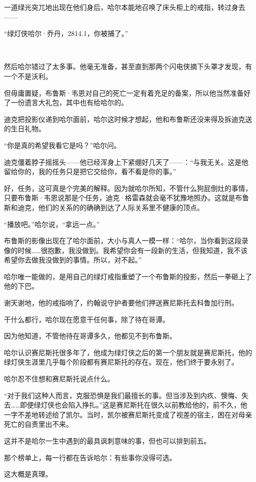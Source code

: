 \documentclass[../main]{subfiles}
\begin{document}
一道绿光突兀地出现在他们身后，哈尔本能地召唤了床头柜上的戒指，转过身去——

“绿灯侠哈尔·乔丹，2814.1，你被捕了。”

~\

然后哈尔错过了太多事。他毫无准备，甚至直到那两个闪电侠摘下头罩才发现，有一个不是沃利。

但毋庸置疑，布鲁斯·韦恩对自己的死亡一定有着充足的备案，所以他当然准备好了一份遗言大礼包，其中也有给哈尔的。

迪克把投影仪递到哈尔面前，哈尔这时候才想起，他和布鲁斯还没来得及拆迪克送的生日礼物。

“你是真的希望我看它是吗？”哈尔问。

迪克僵着脖子摇摇头——他已经浑身上下紧绷好几天了——：“与我无关。这是他留给你的，我的任务只是把它交给你，看不看是你的事。”

好，任务，这可真是个完美的解释。因为就哈尔所知，不管什么狗屁倒灶的事情，只要布鲁斯·韦恩说那是个任务，迪克·格雷森就会毫不犹豫地照办。这就是布鲁斯和迪克，他们的关系的的确确到达了人际关系里不健康的顶点。

“播放吧。”哈尔说，“拿远一点。”

布鲁斯的影像出现在了哈尔面前，大小与真人一模一样：“哈尔，当你看到这段录像的时候……很抱歉，我没做到。我希望你会有一段新的生活，但我知道，我不该希望你去做我没做到的事情。所以，对不起。”

哈尔唯一能做的，是用自己的绿灯戒指重塑了一个布鲁斯的投影，然后一拳砸上了他的下巴。

谢天谢地，他的戒指响了，约翰说守护者要他们押送赛尼斯托去科鲁加行刑。

干什么都行，哈尔现在愿意干任何事，除了待在哥谭。

因为他知道，不管他待在哥谭多久，他都见不到布鲁斯。

哈尔认识赛尼斯托很多年了，他成为绿灯侠之后的第一个朋友就是赛尼斯托，他的绿灯侠生涯里几乎每个阶段都有赛尼斯托的存在。现在，他们终于要永别了。

哈尔忍不住想和赛尼斯托说点什么。

“对于我们这种人而言，克服恐惧是我们最擅长的事。但当涉及到内疚、懊悔、失去……即便绿灯侠也会陷入挣扎。”这是赛尼斯托在很久以前教给他的，前不久，他一字不差地转述给了凯尔。当时，凯尔被赛尼斯托变成了视差的宿主，困在对母亲死亡的自责里出不来。

这并不是哈尔一生中遇到的最具讽刺意味的事，但也可以排到前五。

那个榜单上，每一行都在告诉哈尔：有些事你没得可选。

这大概是真理。
\end{document}
